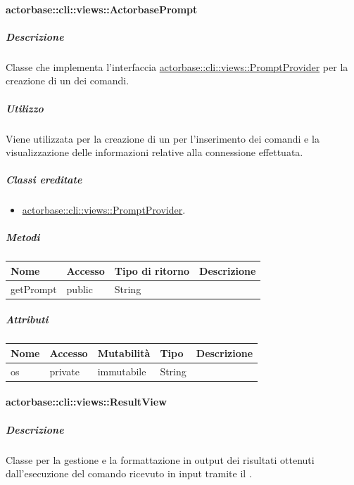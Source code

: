 \documentclass{scalatekids-article}
\begin{document}
\paragraph{actorbase::cli::views::ActorbasePrompt}
\label{sec:actorbase::cli::views::ActorbasePrompt}

\subparagraph{Descrizione}

Classe che implementa l'interfaccia \hyperref[sec:actorbase::cli::views::PromptProvider]{actorbase::cli::views::PromptProvider} per
la creazione di un  dei comandi.

\subparagraph{Utilizzo}

Viene utilizzata per la creazione di un  per l'inserimento dei
comandi e la visualizzazione delle informazioni relative alla connessione
effettuata. %

\subparagraph{Classi ereditate}

\begin{itemize}
\item \hyperref[sec:actorbase::cli::views::PromptProvider]{actorbase::cli::views::PromptProvider}.
\end{itemize}

\subparagraph{Metodi}

\begin{tabular}{| l | l | l | l |}
	\hline
	Nome & Accesso & Tipo di ritorno & Descrizione\\
	\hline
	getPrompt & public & String & \\
	\hline
\end{tabular}

\subparagraph{Attributi}

\begin{tabular}{| l | l | l | l | l |}
	\hline
	Nome & Accesso & Mutabilità & Tipo & Descrizione\\
	\hline
	os & private & immutabile & String & \\
	\hline
\end{tabular}

\paragraph{actorbase::cli::views::ResultView}
\label{sec:actorbase::cli::views::ResultView}

\subparagraph{Descrizione}

Classe per la gestione e la formattazione in output dei risultati ottenuti
dall'esecuzione del comando ricevuto in input tramite il  .
\end{document}
